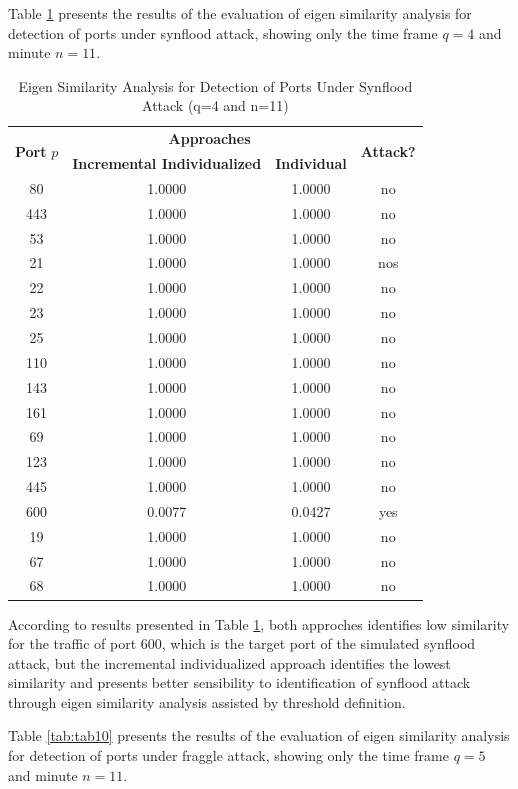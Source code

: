 Table \ref{tab:tab9} presents the results of the evaluation of eigen similarity analysis for detection of ports under synflood attack, showing only the time frame $q=4$ and minute $n=11$.

\begin{table}[h!]
  \centering
  \caption{Eigen Similarity Analysis for Detection of Ports Under Synflood Attack (q=4 and n=11)}
  \label{tab:tab9}
  \begin{tabular}{ c c c c }
	\toprule
	\multirow{2}{*}{\textbf{Port} $p$}   &\multicolumn{2}{c}{\textbf{Approaches}} &\multirow{2}{*}{\textbf{Attack?}}\\ 
			\hhline{~--~}
			&\textbf{Incremental Individualized} &\textbf{Individual}\\
	\midrule
	80 &1.0000 &1.0000 &no \\
	443 &1.0000 &1.0000 &no \\
	53 &1.0000 &1.0000 &no \\
	21 &1.0000 &1.0000 &nos \\
	22 &1.0000 &1.0000 &no \\
	23 &1.0000 &1.0000 &no \\
	25 &1.0000 &1.0000 &no \\
	110 &1.0000 &1.0000 &no \\
	143 &1.0000 &1.0000 &no \\
	161 &1.0000 &1.0000 &no \\
	69 &1.0000 &1.0000 &no \\
	123 &1.0000 &1.0000 &no \\
	445 &1.0000 &1.0000 &no \\
	600 &0.0077 &0.0427 &yes \\
	19 &1.0000 &1.0000 &no \\
	67 &1.0000 &1.0000 &no \\
	68 &1.0000 &1.0000 &no \\
    \bottomrule
  \end{tabular}
\end{table}

According to results presented in Table \ref{tab:tab9}, both approches identifies low similarity for the traffic of port 600, which is the target port of the simulated synflood attack, but the incremental individualized approach identifies the lowest similarity and presents better sensibility to identification of synflood attack through eigen similarity analysis assisted by threshold definition.

Table \ref{tab:tab10} presents the results of the evaluation of eigen similarity analysis for detection of ports under fraggle attack, showing only the time frame $q=5$ and minute $n=11$.

